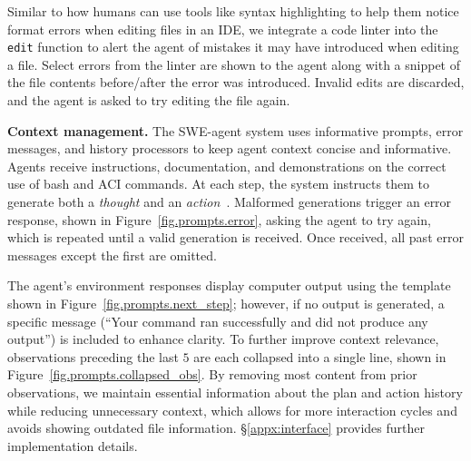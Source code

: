 Similar to how humans can use tools like syntax highlighting to help them notice format errors when editing files in an IDE, we integrate a code linter into the \texttt{edit} function to alert the agent of mistakes it may have introduced when editing a file.
Select errors from the linter are shown to the agent along with a snippet of the file contents before/after the error was introduced.
Invalid edits are discarded, and the agent is asked to try editing the file again.

\textbf{Context management.}
The SWE-agent system uses informative prompts, error messages, and history processors to keep agent context concise and informative.
Agents receive instructions, documentation, and demonstrations on the correct use of bash and ACI commands.
At each step, the system instructs them to generate both a \emph{thought} and an \emph{action}~\citep{yao2023react}.
Malformed generations trigger an error response, shown in Figure~\ref{fig.prompts.error}, asking the agent to try again, which is repeated until a valid generation is received.
Once received, all past error messages except the first are omitted. 

The agent's environment responses display computer output using the template shown in Figure~\ref{fig.prompts.next_step}; however, if no output is generated, a specific message (``Your command ran successfully and did not produce any output'') is included to enhance clarity. To further improve context relevance, observations preceding the last $5$ are each collapsed into a single line, shown in Figure~\ref{fig.prompts.collapsed_obs}.
By removing most content from prior observations, we maintain essential information about the plan and action history while reducing unnecessary context, which allows for more interaction cycles and avoids showing outdated file information. \S\ref{appx:interface} provides further implementation details.
